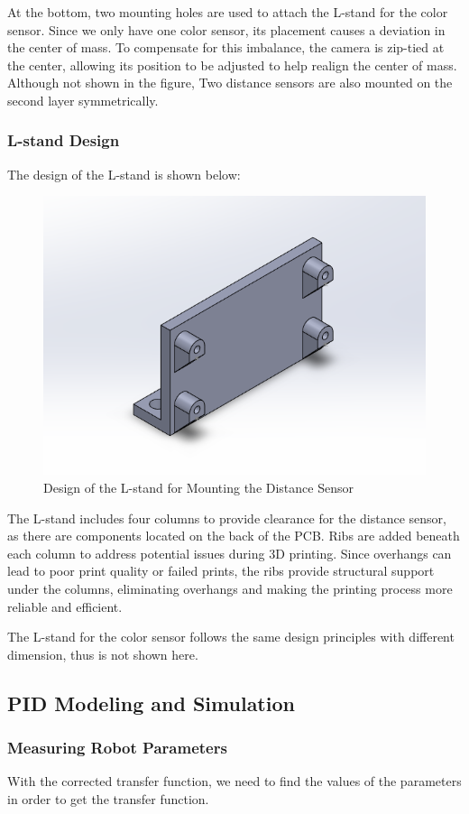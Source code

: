 \documentclass{article}
\begin{document}
At the bottom, two mounting holes are used to attach the L-stand for the color
sensor. Since we only have one color sensor, its placement causes a deviation in
the center of mass. To compensate for this imbalance, the camera is zip-tied at
the center, allowing its position to be adjusted to help realign the center of
mass. Although not shown in the figure, Two distance sensors are also mounted on
the second layer symmetrically.

\subsubsection{L-stand Design}
The design of the L-stand is shown below:
\begin{figure}[H]
    \centerline{\includegraphics[width=0.5\linewidth]{Figures/standDis.png}}
    \caption{Design of the L-stand for Mounting the Distance Sensor}
\end{figure}

The L-stand includes four columns to provide clearance for the distance sensor,
as there are components located on the back of the PCB. Ribs are added beneath
each column to address potential issues during 3D printing. Since overhangs can
lead to poor print quality or failed prints, the ribs provide structural support
under the columns, eliminating overhangs and making the printing process more
reliable and efficient.

The L-stand for the color sensor follows the same design principles with
different dimension, thus is not shown here.
\subsection{PID Modeling and Simulation}
\subsubsection{Measuring Robot Parameters}

With the corrected transfer function, we need to find the values of the
parameters in order to get the transfer function. \\
\end{document}
